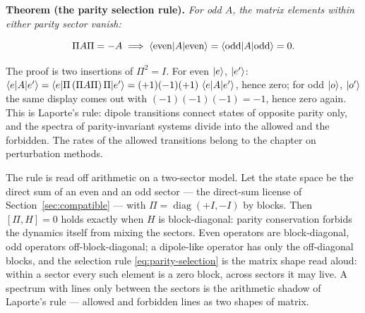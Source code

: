 \textbf{Theorem (the parity selection rule).} \emph{For odd $A$, the matrix elements within either parity sector vanish:}
\begin{linenomath}
    \begin{equation}
        \Pi A \Pi = -A
        \;\Longrightarrow\;
        \braket{\mathrm{even}|A|\mathrm{even}} = \braket{\mathrm{odd}|A|\mathrm{odd}} = 0 .
        \label{eq:parity-selection}
    \end{equation}
\end{linenomath}
The proof is two insertions of $\Pi^2 = I$. For even $\ket{e}$, $\ket{e'}$: $\braket{e|A|e'} = \braket{e|\Pi\,(\Pi A \Pi)\,\Pi|e'} = (+1)(-1)(+1)\,\braket{e|A|e'}$, hence zero; for odd $\ket{o}$, $\ket{o'}$ the same display comes out with $(-1)(-1)(-1) = -1$, hence zero again. This is Laporte's rule: dipole transitions connect states of opposite parity only, and the spectra of parity-invariant systems divide into the allowed and the forbidden. The rates of the allowed transitions belong to the chapter on perturbation methods.

The rule is read off arithmetic on a two-sector model. Let the state space be the direct sum of an even and an odd sector --- the direct-sum license of Section~\ref{sec:compatible} --- with $\Pi = \operatorname{diag}(+I,-I)$ by blocks. Then $[\Pi,H] = 0$ holds exactly when $H$ is block-diagonal: parity conservation forbids the dynamics itself from mixing the sectors. Even operators are block-diagonal, odd operators off-block-diagonal; a dipole-like operator has only the off-diagonal blocks, and the selection rule \eqref{eq:parity-selection} is the matrix shape read aloud: within a sector every such element is a zero block, across sectors it may live. A spectrum with lines only between the sectors is the arithmetic shadow of Laporte's rule --- allowed and forbidden lines as two shapes of matrix.

